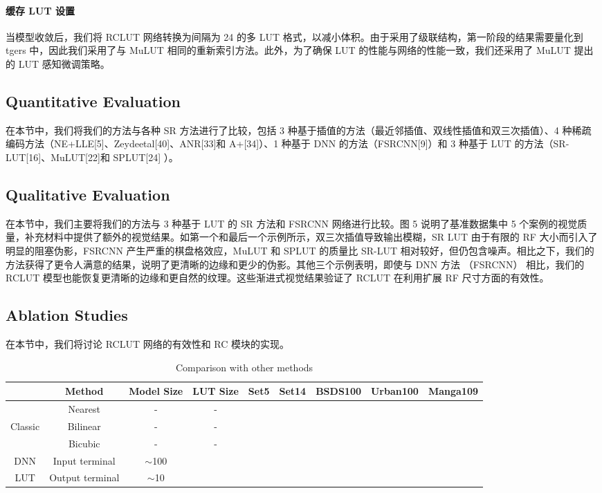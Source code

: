 \documentclass[a4paper]{article}
\begin{document}
\paragraph{缓存 LUT 设置} 当模型收敛后，我们将 RCLUT 网络转换为间隔为 24 的多 LUT 格式，以减小体积。由于采用了级联结构，第一阶段的结果需要量化到 tgers 中，因此我们采用了与 MuLUT 相同的重新索引方法。此外，为了确保 LUT 的性能与网络的性能一致，我们还采用了 MuLUT 提出的 LUT 感知微调策略。



\subsection{Quantitative Evaluation}
在本节中，我们将我们的方法与各种 SR 方法进行了比较，包括 3 种基于插值的方法（最近邻插值、双线性插值和双三次插值）、4 种稀疏编码方法（NE+LLE[5]、Zeydeetal[40]、ANR[33]和 A+[34]）、1 种基于 DNN 的方法（FSRCNN[9]）和 3 种基于 LUT 的方法（SR-LUT[16]、MuLUT[22]和 SPLUT[24] ）。

\subsection{Qualitative Evaluation}

在本节中，我们主要将我们的方法与 3 种基于 LUT 的 SR 方法和 FSRCNN 网络进行比较。图 5 说明了基准数据集中 5 个案例的视觉质量，补充材料中提供了额外的视觉结果。如第一个和最后一个示例所示，双三次插值导致输出模糊，SR LUT 由于有限的 RF 大小而引入了明显的阻塞伪影，FSRCNN 产生严重的棋盘格效应，MuLUT 和 SPLUT 的质量比 SR-LUT 相对较好，但仍包含噪声。相比之下，我们的方法获得了更令人满意的结果，说明了更清晰的边缘和更少的伪影。其他三个示例表明，即使与 DNN 方法 （FSRCNN） 相比，我们的 RCLUT 模型也能恢复更清晰的边缘和更自然的纹理。这些渐进式视觉结果验证了 RCLUT 在利用扩展 RF 尺寸方面的有效性。


\subsection{Ablation Studies}
在本节中，我们将讨论 RCLUT 网络的有效性和 RC 模块的实现。


\begin{table}
    \caption{Comparison with other methods}
    \centering
    \begin{tabular}{ccccccccc}
        \toprule
        & Method    & Model Size    & LUT Size  & Set5  & Set14 & BSDS100   & Urban100  & Manga109 \\
        \midrule
        & Nearest   & -             & -      \\
        Classic  & Bilinear   & -             & -      \\
        & Bicubic   & -             & -      \\
        \midrule
        DNN      & Input terminal  & $\sim$100     \\
        \midrule
        LUT      & Output terminal & $\sim$10      \\
        \bottomrule
    \end{tabular}
    \label{tab:tab_01}
\end{table}
\end{document}

